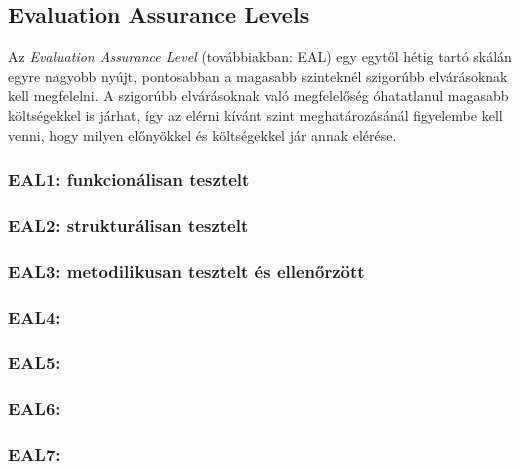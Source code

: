 \subsection{Evaluation Assurance Levels}

Az \emph{Evaluation Assurance Level} (továbbiakban: EAL) egy egytől hétig tartó skálán egyre nagyobb
nyújt, pontosabban a magasabb szinteknél szigorúbb elvárásoknak kell megfelelni. A szigorúbb
elvárásoknak való megfelelőség óhatatlanul magasabb költségekkel is járhat, így az elérni kívánt
szint meghatározásánál figyelembe kell venni, hogy milyen előnyökkel és költségekkel jár annak
elérése. \cite{DipPortal}

\subsubsection{EAL1: funkcionálisan tesztelt}

\subsubsection{EAL2: strukturálisan tesztelt}

\subsubsection{EAL3: metodilikusan tesztelt és ellenőrzött}
\subsubsection{EAL4: }
\subsubsection{EAL5:}
\subsubsection{EAL6:}
\subsubsection{EAL7:}
